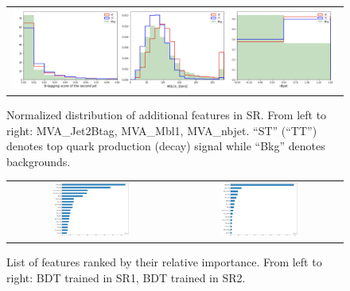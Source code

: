 \begin{figure}[tbh!]
 \begin{center}
 \begin{tabular}{c}
 \includegraphics[width=0.99\textwidth]{figures/Part3/BDT/Features5}\\
 \end{tabular}
 \caption{Normalized distribution of additional features in SR. From left to right: MVA\_Jet2Btag, MVA\_Mbl1, MVA\_nbjet. ``ST'' (``TT'') denotes top quark production (decay) signal while ``Bkg'' denotes backgrounds.}
 \label{fig:Features5}
 \end{center}
\end{figure}

\begin{figure}[tbh!]
 \begin{center}
 \begin{tabular}{cc}
 \includegraphics[width=0.48\textwidth]{figures/Part3/BDT/TTranking}&
 \includegraphics[width=0.48\textwidth]{figures/Part3/BDT/STranking}\\
 \end{tabular}
 \caption{List of features ranked by their relative importance. From left to right: \ac{BDT} trained in \ac{SR}1, \ac{BDT} trained in \ac{SR}2.}
 \label{fig:Ranking}
 \end{center}
\end{figure}

